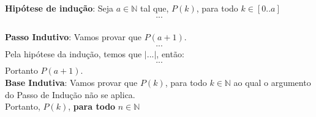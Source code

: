 \textbf{Hipótese de indução}: Seja $a \in \mathbb{N}$ tal que, $P(k)$, para todo $k \in [0..a]$
\begin{eqnarray*}
...
\end{eqnarray*}
\\
\textbf{Passo Indutivo}: Vamos provar que $P(a+1)$.
\begin{eqnarray*}
...
\end{eqnarray*}
Pela hipótese da indução, temos que $|...|$, então:
\begin{eqnarray*}
... 
\end{eqnarray*}
Portanto $P(a+1)$.
\\
\textbf{Base Indutiva}: Vamos provar que $P(k)$, para todo $k \in \mathbb{N}$ ao qual o argumento do Passo de Indução não se aplica.
\\
Portanto, $P(k)$, \textbf{para todo} $n \in \mathbb{N}$